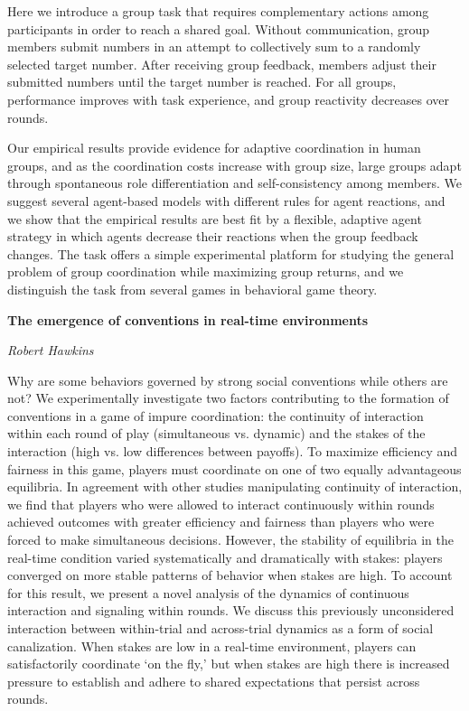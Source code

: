 \documentclass[10pt,letterpaper]{article}
\begin{document}
Here we introduce a group task that requires complementary actions among participants in order to reach a shared goal.  Without communication, group members submit numbers in an attempt to collectively sum to a randomly selected target number.  After receiving group feedback, members adjust their submitted numbers until the target number is reached.  For all groups, performance improves with task experience, and group reactivity decreases over rounds.  

Our empirical results provide evidence for adaptive coordination in human groups, and as the coordination costs increase with group size, large groups adapt through spontaneous role differentiation and self-consistency among members.  We suggest several agent-based models with different rules for agent reactions, and we show that the empirical results are best fit by a flexible, adaptive agent strategy in which agents decrease their reactions when the group feedback changes.  The task offers a simple experimental platform for studying the general problem of group coordination while maximizing group returns, and we distinguish the task from several games in behavioral game theory.

\begin{center}\textbf{The emergence of conventions in real-time environments}\end{center}
\begin{center}\emph{Robert Hawkins}\end{center}

Why are some behaviors governed by strong social conventions while others are not? We experimentally investigate two factors contributing to the formation of conventions in a game of impure coordination: the continuity of interaction within each round of play (simultaneous vs. dynamic) and the stakes of the interaction (high vs. low differences between payoffs). To maximize efficiency and fairness in this game, players must coordinate on one of two equally advantageous equilibria. In agreement with other studies manipulating continuity of interaction, we find that players who were allowed to interact continuously within rounds achieved outcomes with greater efficiency and fairness than players who were forced to make simultaneous decisions. However, the stability of equilibria in the real-time condition varied systematically and dramatically with stakes: players converged on more stable patterns of behavior when stakes are high. To account for this result, we present a novel analysis of the dynamics of continuous interaction and signaling within rounds. We discuss this previously unconsidered interaction between within-trial and across-trial dynamics as a form of social canalization. When stakes are low in a real-time environment, players can satisfactorily coordinate `on the fly,' but when stakes are high there is increased pressure to establish and adhere to shared expectations that persist across rounds.
\end{document}
